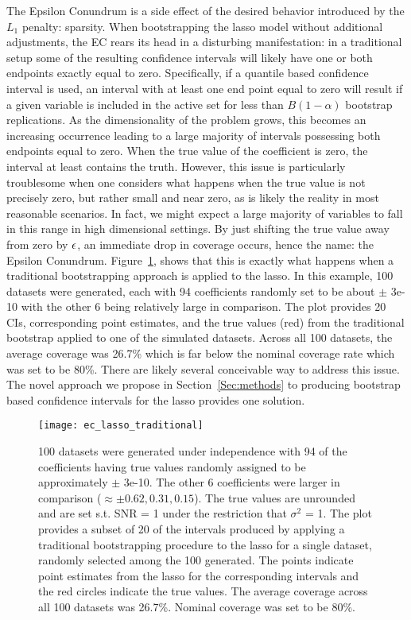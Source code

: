The Epsilon Conundrum is a side effect of the desired behavior introduced by the $L_1$ penalty: sparsity. When bootstrapping the lasso model without additional adjustments, the EC rears its head in a disturbing manifestation: in a traditional setup some of the resulting confidence intervals will likely have one or both endpoints exactly equal to zero. Specifically, if a quantile based confidence interval is used, an interval with at least one end point equal to zero will result if a given variable is included in the active set for less than $B(1 - \alpha)$ bootstrap replications. As the dimensionality of the problem grows, this becomes an increasing occurrence leading to a large majority of intervals possessing both endpoints equal to zero. When the true value of the coefficient is zero, the interval at least contains the truth. However, this issue is particularly troublesome when one considers what happens when the true value is not precisely zero, but rather small and near zero, as is likely the reality in most reasonable scenarios. In fact, we might expect a large majority of variables to fall in this range in high dimensional settings. By just shifting the true value away from zero by $\epsilon$, an immediate drop in coverage occurs, hence the name: the Epsilon Conundrum. Figure~\ref{Fig:traditional}, shows that this is exactly what happens when a traditional bootstrapping approach is applied to the lasso. In this example, 100 datasets were generated, each with 94 coefficients randomly set to be about $\pm$ 3e-10 with the other 6 being relatively large in comparison. The plot provides 20 CIs, corresponding point estimates, and the true values (red) from the traditional bootstrap applied to one of the simulated datasets. Across all 100 datasets, the average coverage was 26.7\% which is far below the nominal coverage rate which was set to be 80\%. There are likely several conceivable way to address this issue. The novel approach we propose in Section~\ref{Sec:methods} to producing bootstrap based confidence intervals for the lasso provides one solution.

\begin{figure}[hbtp]
  \begin{center}
    \texttt{[image: ec\_lasso\_traditional]}
    \caption{\label{Fig:traditional} 100 datasets were generated under independence with 94 of the coefficients having true values randomly assigned to be approximately $\pm$ 3e-10. The other 6 coefficients were larger in comparison ($\approx \pm 0.62, 0.31, 0.15$). The true values are unrounded and are set s.t. SNR = 1 under the restriction that $\sigma^2$ = 1. The plot provides a subset of 20 of the intervals produced by applying a traditional bootstrapping procedure to the lasso for a single dataset, randomly selected among the 100 generated. The points indicate point estimates from the lasso for the corresponding intervals and the red circles indicate the true values. The average coverage across all 100 datasets was 26.7\%. Nominal coverage was set to be 80\%.}
  \end{center}
  \end{figure}

